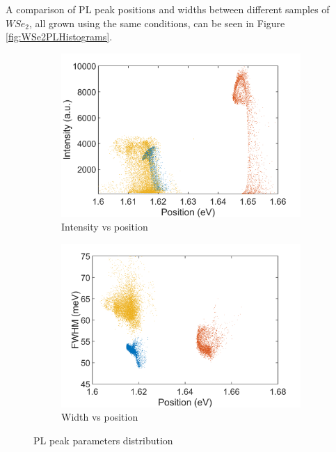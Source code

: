 A comparison of PL peak positions and widths between different samples of $WSe_2$, all grown using the same conditions, can be seen in Figure \ref{fig:WSe2PLHistograms}.

\begin{figure}[H]
	\begin{center}
		\begin{subfigure}[b]{0.45\textwidth}
			\includegraphics[width=\textwidth]{WSe2/WSe2PositionIntensityScatterComparison.png}
			\caption{Intensity vs position}
			\label{fig:WSe2PositionIntensityScatterComparison}
		\end{subfigure}
		\qquad
		\begin{subfigure}[b]{0.45\textwidth}
			\includegraphics[width=\textwidth]{WSe2/Wse2PositionWidthScatterComparison.png}
			\caption{Width vs position}
			\label{fig:WSe2PositionWidthScatterComparison}
		\end{subfigure}
		\caption{PL peak parameters distribution}
		\label{fig:WSe2ScatterComparison}
	\end{center}
\end{figure}

